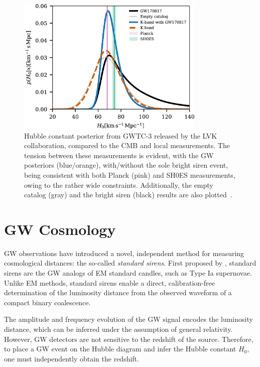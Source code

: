 \begin{figure}[h!]
    \centering
    \includegraphics[width=0.8\textwidth]{figures/apjac74bbf9_hr.jpg}
    \caption[Hubble tension and standard sirens.]{Hubble constant posterior from \ac{GWTC}-3 released by the \ac{LVK} collaboration, compared to the \ac{CMB} and local measurements. The tension between these measurements is evident, with the \ac{GW} posteriors (blue/orange), with/without the sole bright siren event, being consistent with both Planck (pink) and \ac{SH0ES} measurements, owing to the rather wide constraints. Additionally, the empty catalog (gray) and the bright siren (black) results are also plotted~\citep{abbott2023constraints}.}
    \label{fig:hubble_tension_gw}
\end{figure}

\newpage

\section{\ac{GW} Cosmology}
\ac{GW} observations have introduced a novel, independent method for measuring cosmological distances: the so-called \textit{standard sirens}. First proposed by \citet{schutz1986determining}, standard sirens are the \ac{GW} analogs of \ac{EM} standard candles, such as Type Ia supernovae. Unlike \ac{EM} methods, standard sirens enable a direct, calibration-free determination of the luminosity distance from the observed waveform of a compact binary coalescence.

The amplitude and frequency evolution of the \ac{GW} signal encodes the luminosity distance, which can be inferred under the assumption of general relativity. However, \ac{GW} detectors are not sensitive to the redshift of the source. Therefore, to place a \ac{GW} event on the Hubble diagram and infer the Hubble constant $H_0$, one must independently obtain the redshift.

